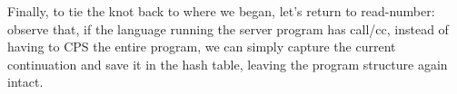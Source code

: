 
Finally, to tie the knot back to where we began, let’s return to read-number:
observe that, if the language running the server program has call/cc, instead of
having to CPS the entire program, we can simply capture the current continuation
and save it in the hash table, leaving the program structure again intact.
